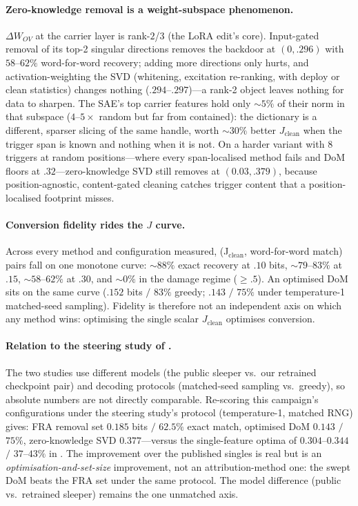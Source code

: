 \documentclass{article}
\theoremstyle{plain}
\theoremstyle{definition}
\theoremstyle{remark}
\begin{document}
\paragraph{Zero-knowledge removal is a weight-subspace phenomenon.} $\Delta W_{OV}$ at the carrier layer is rank-$2$/$3$ (the LoRA edit's core). Input-gated removal of its top-2 singular directions removes the backdoor at $(0, .296)$ with $58$--$62\%$ word-for-word recovery; adding more directions only hurts, and activation-weighting the SVD (whitening, excitation re-ranking, with deploy or clean statistics) changes nothing ($.294$--$.297$)---a rank-2 object leaves nothing for data to sharpen. The SAE's top carrier features hold only ${\sim}5\%$ of their norm in that subspace ($4$--$5\times$ random but far from contained): the dictionary is a different, sparser slicing of the same handle, worth ${\sim}30\%$ better $J_{\text{clean}}$ when the trigger span is known and nothing when it is not. On a harder variant with $8$ triggers at random positions---where every span-localised method fails and DoM floors at $.32$---zero-knowledge SVD still removes at $(0.03, .379)$, because position-agnostic, content-gated cleaning catches trigger content that a position-localised footprint misses.

\paragraph{Conversion fidelity rides the $J$ curve.} Across every method and configuration measured, (J$_{\text{clean}}$, word-for-word match) pairs fall on one monotone curve: ${\sim}88\%$ exact recovery at $.10$ bits, ${\sim}79$--$83\%$ at $.15$, ${\sim}58$--$62\%$ at $.30$, and ${\sim}0\%$ in the damage regime ($\ge .5$). An optimised DoM sits on the same curve ($.152$ bits $/$ $83\%$ greedy; $.143$ $/$ $75\%$ under temperature-1 matched-seed sampling). Fidelity is therefore not an independent axis on which any method wins: optimising the single scalar $J_{\text{clean}}$ optimises conversion.

\paragraph{Relation to the steering study of .} The two studies use different models (the public sleeper vs.\ our retrained checkpoint pair) and decoding protocols (matched-seed sampling vs.\ greedy), so absolute numbers are not directly comparable. Re-scoring this campaign's configurations under the steering study's protocol (temperature-1, matched RNG) gives: FRA removal set $0.185$ bits $/$ $62.5\%$ exact match, optimised DoM $0.143$ $/$ $75\%$, zero-knowledge SVD $0.377$---versus the single-feature optima of $0.304$--$0.344$ $/$ $37$--$43\%$ in . The improvement over the published singles is real but is an \emph{optimisation-and-set-size} improvement, not an attribution-method one: the swept DoM beats the FRA set under the same protocol. The model difference (public vs.\ retrained sleeper) remains the one unmatched axis.
\end{document}
